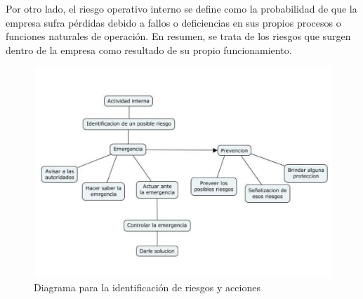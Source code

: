     Por otro lado, el riesgo operativo interno se define como la probabilidad de que la empresa sufra pérdidas debido a fallos o deficiencias en sus propios procesos o funciones naturales de operación. En resumen, se trata de los riesgos que surgen dentro de la empresa como resultado de su propio funcionamiento.
    \begin{figure}[H]
        \centering
        \includegraphics[scale=0.185]{30/img/RiesgosInternos.pdf}
        \caption{Diagrama para la identificación de riesgos y acciones}
    \end{figure}

